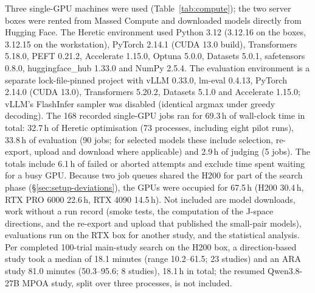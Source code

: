 Three single-GPU machines were used (Table~\ref{tab:compute}); the two server
boxes were rented from Massed Compute and downloaded models directly from
Hugging Face. The Heretic environment used Python 3.12 (3.12.16 on the boxes,
3.12.15 on the workstation), PyTorch 2.14.1 (CUDA 13.0 build), Transformers
5.18.0, PEFT 0.21.2, Accelerate 1.15.0, Optuna 5.0.0, Datasets 5.0.1,
safetensors 0.8.0, huggingface\_hub 1.33.0 and NumPy 2.5.4. The evaluation
environment is a separate lock-file-pinned project with vLLM 0.33.0, lm-eval
0.4.13, PyTorch 2.14.0 (CUDA 13.0), Transformers 5.20.2, Datasets 5.1.0 and
Accelerate 1.15.0; vLLM's FlashInfer sampler was disabled (identical argmax
under greedy decoding). The 168 recorded single-GPU jobs ran for 69.3\,h of
wall-clock time in total: 32.7\,h of Heretic optimisation (73 processes,
including eight pilot runs), 33.8\,h of evaluation (90 jobs; for selected
models these include selection, re-export, upload and download where
applicable) and 2.9\,h of judging (5 jobs). The totals include 6.1\,h of failed
or aborted attempts and exclude time spent waiting for a busy GPU. Because two
job queues shared the H200 for part of the search phase
(\S\ref{sec:setup-deviations}), the GPUs were occupied for 67.5\,h (H200
30.4\,h, RTX PRO 6000 22.6\,h, RTX 4090 14.5\,h). Not included are model
downloads, work without a run record (smoke tests, the computation of the
J-space directions, and the re-export and upload that published the
small-pair models), evaluations run on the RTX box for another study, and the
statistical analysis. Per completed 100-trial main-study search on the H200
box, a direction-based study took a median of 18.1 minutes (range 10.2--61.5;
23 studies) and an ARA study 81.0 minutes (50.3--95.6; 8 studies), 18.1\,h in
total; the resumed Qwen3.8-27B MPOA study, split over three processes, is not
included.
